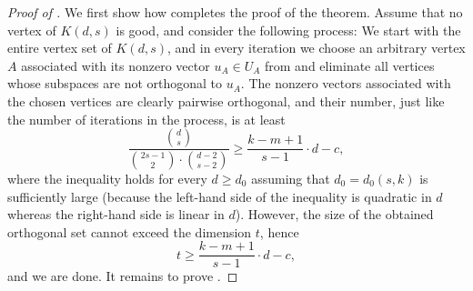 \documentclass{toc}
\begin{document}
\begin{proof}[Proof of ]
We first show how  completes the proof of the theorem.
Assume that no vertex of $K(d,s)$ is good, and consider the  following process: We start with the entire vertex set of $K(d,s)$, and in every iteration we choose an arbitrary vertex $A$ associated with its nonzero vector $u_A \in U_A$ from  and eliminate all vertices whose subspaces are not orthogonal to $u_A$. The nonzero vectors associated with the chosen vertices are clearly pairwise orthogonal, and their number, just like the number of iterations in the process, is at least
\[\frac{\binom{d}{s}}{\binom{2s-1}{2} \cdot \binom{d-2}{s-2}} \geq \frac{k-m+1}{s-1} \cdot d-c,\]
where the inequality holds for every $d \geq d_0$ assuming that $d_0 = d_0(s,k)$ is sufficiently large (because the left-hand side of the inequality is quadratic in $d$ whereas the right-hand side is linear in $d$).
However, the size of the obtained orthogonal set cannot exceed the dimension $t$, hence
\[t \geq \frac{k-m+1}{s-1} \cdot d-c,\]
and we are done. It remains to prove .


\end{proof}
\end{document}
